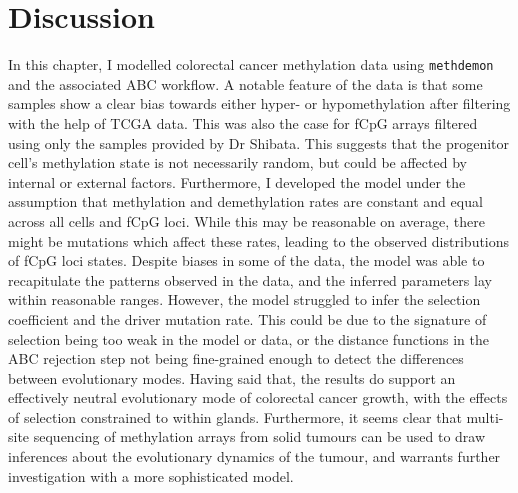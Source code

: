 \section{Discussion}

In this chapter, I modelled colorectal cancer methylation data using
\texttt{methdemon} and the associated ABC workflow. A notable feature of the
data is that some samples show a clear bias towards either hyper- or
hypomethylation after filtering with the help of TCGA data. This was also the
case for fCpG arrays filtered using only the samples provided by Dr Shibata.
This suggests that the progenitor cell's methylation state is not necessarily
random, but could be affected by internal or external factors. Furthermore, I
developed the model under the assumption that methylation and demethylation
rates are constant and equal across all cells and fCpG loci. While this may be
reasonable on average, there might be mutations which affect these rates,
leading to the observed distributions of fCpG loci states. Despite biases in
some of the data, the model was able to recapitulate the patterns observed in
the data, and the inferred parameters lay within reasonable ranges. However,
the model struggled to infer the selection coefficient and the driver mutation
rate. This could be due to the signature of selection being too weak in the
model or data, or the distance functions in the ABC rejection step not being
fine-grained enough to detect the differences between evolutionary modes.
Having said that, the results do support an effectively neutral evolutionary
mode of colorectal cancer growth, with the effects of selection constrained to
within glands. Furthermore, it seems clear that multi-site sequencing of
methylation arrays from solid tumours can be used to draw inferences about the
evolutionary dynamics of the tumour, and warrants further investigation with a
more sophisticated model.

